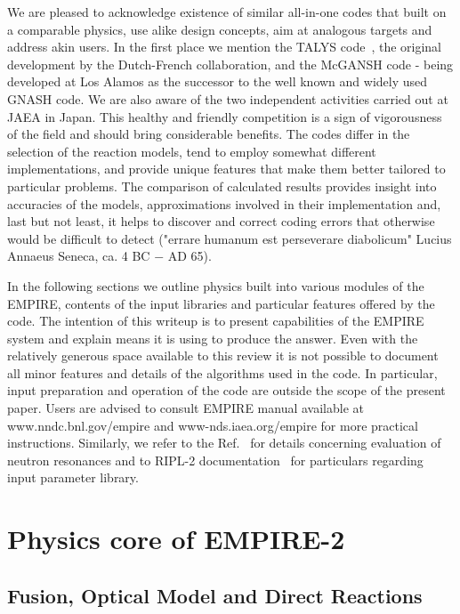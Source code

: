 \documentclass[twocolumn,amsmath,amssymb,10pt,groupedaddress,a4paper]{revtex4}
\begin{document}
We are pleased to acknowledge existence of similar all-in-one codes that built on a comparable physics, use alike design concepts, aim at analogous targets and address akin users. In the first place we mention the TALYS code~\cite{TALYS}, the original development by the Dutch-French collaboration, and the McGANSH code - being developed at Los Alamos as the successor to the well known and widely used GNASH code. We are also aware of the two independent activities carried out at JAEA in Japan. This healthy and friendly competition is a sign of vigorousness of the field and should bring considerable benefits. The codes differ in the selection of the reaction models, tend to employ somewhat different implementations, and provide unique  features that make them better tailored to particular problems. The comparison of calculated results provides insight into accuracies of the models, approximations involved in their implementation and, last but not least, it helps to discover and correct coding errors that otherwise would be difficult to detect ("errare humanum est perseverare diabolicum" Lucius Annaeus Seneca, ca. 4 BC $-$ AD 65).

In the following sections we outline physics built into various modules of the EMPIRE, contents of the input libraries and particular features offered by the code. The intention of this writeup is to present capabilities of the EMPIRE system and explain means it is using to produce the answer. Even with the relatively generous space available to this review it is not possible to document all minor features and details of the algorithms used in the code. In particular, input preparation and operation of the code are outside the scope of the present paper. Users are advised to consult EMPIRE manual available at www.nndc.bnl.gov/empire and www-nds.iaea.org/empire for more practical instructions. Similarly, we
refer to the Ref.~\cite{Mughabghab:06} for details concerning evaluation of neutron resonances and to RIPL-2 documentation~\cite{RIPL-2} for particulars regarding input parameter library.

\section{Physics core of EMPIRE-2}

\subsection{Fusion, Optical Model and Direct Reactions}
\end{document}
